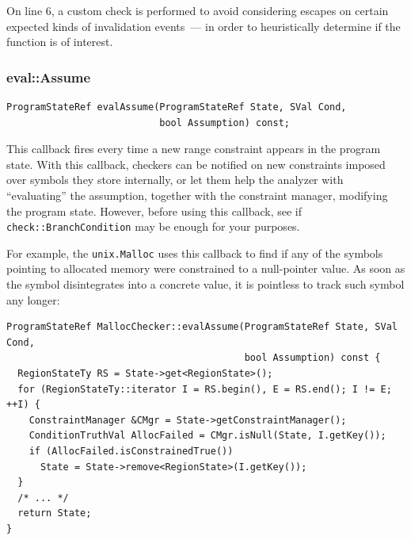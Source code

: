 \documentclass[a4paper,12pt]{article}
\newenvironment{nobr}{\begin{minipage}{\textwidth}\setlength\parskip{1em}
}{\end{minipage}\ignorespacesafterend}
\begin{document}
On line 6, a custom check is performed to avoid considering escapes on certain expected kinds of invalidation events~--- in order to heuristically determine if the function is of interest.


\begin{nobr}
\subsubsection{eval::Assume}

\begin{lstlisting}[style=cplusplus,numbers=none]
ProgramStateRef evalAssume(ProgramStateRef State, SVal Cond,
                           bool Assumption) const;
\end{lstlisting}

This callback fires every time a new range constraint appears in the program state. With this callback, checkers can be notified on new constraints imposed over symbols they store internally, or let them help the analyzer with ``evaluating'' the assumption, together with the constraint manager, modifying the program state. However, before using this callback, see if \lstinline|check::BranchCondition| may be enough for your purposes.
\end{nobr}

\begin{nobr}
For example, the \lstinline|unix.Malloc| uses this callback to find if any of the symbols pointing to allocated memory were constrained to a null-pointer value. As soon as the symbol disintegrates into a concrete value, it is pointless to track such symbol any longer:

\begin{lstlisting}[style=cplusplus]
ProgramStateRef MallocChecker::evalAssume(ProgramStateRef State, SVal Cond,
                                          bool Assumption) const {
  RegionStateTy RS = State->get<RegionState>();
  for (RegionStateTy::iterator I = RS.begin(), E = RS.end(); I != E; ++I) {
    ConstraintManager &CMgr = State->getConstraintManager();
    ConditionTruthVal AllocFailed = CMgr.isNull(State, I.getKey());
    if (AllocFailed.isConstrainedTrue())
      State = State->remove<RegionState>(I.getKey());
  }
  /* ... */
  return State;
}
\end{lstlisting}
\end{nobr}
\end{document}

